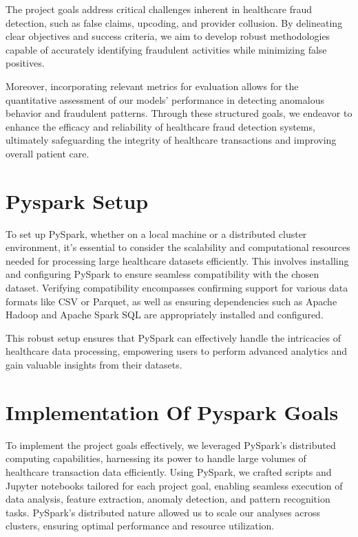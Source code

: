 \documentclass{article}
\begin{document}
\hspace{0.5cm}The project goals address critical challenges inherent in healthcare fraud detection, such as false claims, upcoding, and provider collusion. By delineating clear objectives and success criteria, we aim to develop robust methodologies capable of accurately identifying fraudulent activities while minimizing false positives. 

\hspace{0.5cm}Moreover, incorporating relevant metrics for evaluation allows for the quantitative assessment of our models' performance in detecting anomalous behavior and fraudulent patterns. Through these structured goals, we endeavor to enhance the efficacy and reliability of healthcare fraud detection systems, ultimately safeguarding the integrity of healthcare transactions and improving overall patient care.
\section{Pyspark Setup}
\hspace{1cm}To set up PySpark, whether on a local machine or a distributed cluster environment, it's essential to consider the scalability and computational resources needed for processing large healthcare datasets efficiently. This involves installing and configuring PySpark to ensure seamless compatibility with the chosen dataset. Verifying compatibility encompasses confirming support for various data formats like CSV or Parquet, as well as ensuring dependencies such as Apache Hadoop and Apache Spark SQL are appropriately installed and configured. 

\hspace{0.5cm}This robust setup ensures that PySpark can effectively handle the intricacies of healthcare data processing, empowering users to perform advanced analytics and gain valuable insights from their datasets.
\section{Implementation Of Pyspark Goals}
\hspace{1cm}To implement the project goals effectively, we leveraged PySpark's distributed computing capabilities, harnessing its power to handle large volumes of healthcare transaction data efficiently. Using PySpark, we crafted scripts and Jupyter notebooks tailored for each project goal, enabling seamless execution of data analysis, feature extraction, anomaly detection, and pattern recognition tasks. PySpark's distributed nature allowed us to scale our analyses across clusters, ensuring optimal performance and resource utilization. 
\end{document}
